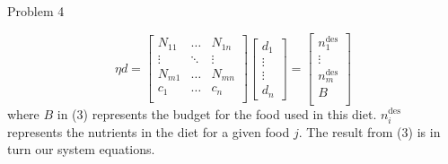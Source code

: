 \begin{problem}{Problem 4}
\begin{highlight}[Solution]
        \begin{equation}
            \eta d = 
            \begin{bmatrix}
                N_{11} & \dots & N_{1n} \\
                \vdots & \ddots & \vdots \\
                N_{m1} & \dots & N_{mn} \\
                c_{1} & \dots & c_{n} \\
            \end{bmatrix}
            \begin{bmatrix}
                d_{1} \\
                \vdots \\
                \vdots \\
                d_{n}
            \end{bmatrix}
            = 
            \begin{bmatrix}
                n_{1}^{\text{des}} \\
                \vdots \\
                n_{m}^{\text{des}} \\
                B \\
            \end{bmatrix}
        \end{equation}
        where $B$ in (3) represents the budget for the food used in this diet. $n_{i}^{\text{des}}$ represents the nutrients in the diet for a given food $j$. The result from (3) is in turn our system
        equations.
    \end{highlight}
\end{problem}

